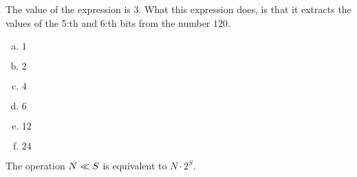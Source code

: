 \begin{Answer}[ref={bit-shiting}]

  The value of the expression is $3$. What this expression does, is
  that it extracts the values of the 5:th and 6:th bits from the
  number $120$.

\end{Answer}

\begin{Answer}[ref={bit-equiv}]

  \begin{enumerate}[(a)]
  \item $1$
  \item $2$
  \item $4$
  \item $6$
  \item $12$
  \item $24$
  \end{enumerate}

  The operation $N \ll S$ is equivalent to $N \cdot 2^S$.

\end{Answer}

\begin{Answer}[ref={bitcount}]

  \begin{algorithmic}[1]
    \State {}
    \EndIf
    \EndFor
    \State {}
    \EndProcedure
  \end{algorithmic}

\end{Answer}

